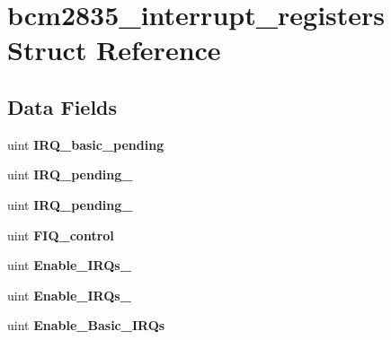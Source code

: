 \hypertarget{structbcm2835__interrupt__registers}{\section{bcm2835\-\_\-interrupt\-\_\-registers Struct Reference}
\label{structbcm2835__interrupt__registers}
}
\subsection*{Data Fields}
\begin{DoxyCompactItemize}
\item 
\hypertarget{structbcm2835__interrupt__registers_a9368163f96d31abdf407e7c1bc95593e}{uint {\bfseries I\-R\-Q\-\_\-basic\-\_\-pending}}\label{structbcm2835__interrupt__registers_a9368163f96d31abdf407e7c1bc95593e}

\item 
\hypertarget{structbcm2835__interrupt__registers_ac3714bb62f0fa85de76ae966b8e426da}{uint {\bfseries I\-R\-Q\-\_\-pending\-\_}}\label{structbcm2835__interrupt__registers_ac3714bb62f0fa85de76ae966b8e426da}

\item 
\hypertarget{structbcm2835__interrupt__registers_a9387df1e46297e0e5ef59035fea988d0}{uint {\bfseries I\-R\-Q\-\_\-pending\-\_}}\label{structbcm2835__interrupt__registers_a9387df1e46297e0e5ef59035fea988d0}

\item 
\hypertarget{structbcm2835__interrupt__registers_a69f5594664df6737f8e5caa0544762d6}{uint {\bfseries F\-I\-Q\-\_\-control}}\label{structbcm2835__interrupt__registers_a69f5594664df6737f8e5caa0544762d6}

\item 
\hypertarget{structbcm2835__interrupt__registers_ad26c98fe800e5f12bef3c4ea86f232df}{uint {\bfseries Enable\-\_\-\-I\-R\-Qs\-\_}}\label{structbcm2835__interrupt__registers_ad26c98fe800e5f12bef3c4ea86f232df}

\item 
\hypertarget{structbcm2835__interrupt__registers_a2a8e8a4aa0e1f94d6f7f3be90e013c8e}{uint {\bfseries Enable\-\_\-\-I\-R\-Qs\-\_}}\label{structbcm2835__interrupt__registers_a2a8e8a4aa0e1f94d6f7f3be90e013c8e}

\item 
\hypertarget{structbcm2835__interrupt__registers_ad4099623b1cb1c2dcbb2fcdaaf951944}{uint {\bfseries Enable\-\_\-\-Basic\-\_\-\-I\-R\-Qs}}\label{structbcm2835__interrupt__registers_ad4099623b1cb1c2dcbb2fcdaaf951944}


\end{DoxyCompactItemize}
